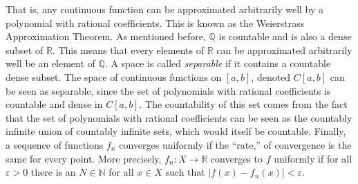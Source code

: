 \documentclass[crop=false,class=article,oneside]{standalone}
\begin{document}
            That is, any continuous function can be approximated
            arbitrarily well by a polynomial with rational
            coefficients. This is known as the
            Weierstrass Approximation Theorem. As mentioned
            before, $\mathbb{Q}$ is countable and is also
            a dense subset of $\mathbb{R}$. This means that
            every elements of $\mathbb{R}$ can be approximated
            arbitrarily well be an element of $\mathbb{Q}$. A
            space is called \textit{separable} if it contains
            a countable dense subset. The space of continuous
            functions on $[a,b]$, denoted $C[a,b]$ can be seen
            as separable, since the set of polynomials with
            rational coefficients is countable and dense in
            $C[a,b]$. The countability of this set comes from
            the fact that the set of polynomials with rational
            coefficients can be seen as the countably infinite
            union of countably infinite sets, which would itself
            be countable. Finally, a sequence of functions
            $f_{n}$ converges uniformly if the ``rate,'' of
            convergence is the same for every point. More precisely,
            $f_{n}:X\rightarrow\mathbb{R}$ converges to $f$
            uniformly if for all $\varepsilon>0$ there is an
            $N\in\mathbb{N}$ for all $x\in{X}$ such that
            $|f(x)-f_{n}(x)|<\varepsilon$.
\end{document}
